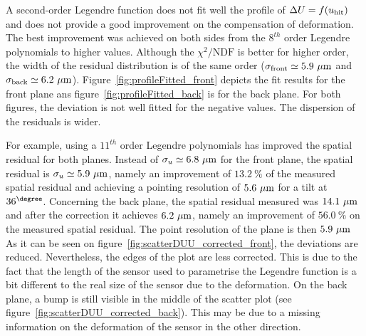       A second-order Legendre function does not fit well the profile of $\Delta U=f(u_{\rm{hit}})$ and does not provide a good improvement on the compensation of deformation.
      The best improvement was achieved on both sides from the $8^{th}$ order Legendre polynomials to higher values.
      Although the $\chi^2 \text{/NDF}$ is better for higher order, the width of the residual distribution is of the same order ($\sigma_{\rm{front}}\simeq 5.9~\rm{\mu m}$ and $\sigma_{\rm{back}} \simeq 6.2~\rm{\mu m}$).
      Figure~\ref{fig:profileFitted_front} depicts the fit results for the front plane ans figure~\ref{fig:profileFitted_back} is for the back plane.
      For both figures, the deviation is not well fitted for the negative values.
      The dispersion of the residuals is wider. 

      For example, using a $11^{th}$ order Legendre polynomials has improved the spatial residual for both planes. 
      Instead of $\sigma_{u} \simeq 6.8~\rm{\mu m}$ for the front plane, the spatial residual is $\sigma_{u} \simeq 5.9~\rm{\mu m}$, namely an improvement of $13.2~\%$ of the measured spatial residual and achieving a pointing resolution of $5.6~\rm{\mu m}$ for a tilt at $36^{\degree}$.
      Concerning the back plane, the spatial residual measured was $14.1~\rm{\mu m}$ and after the correction it achieves $6.2~\rm{\mu m}$, namely an improvement of $56.0~\%$ on the measured spatial residual.
      The point resolution of the plane is then $5.9~\rm{\mu m}$
      As it can be seen on figure~\ref{fig:scatterDUU_corrected_front}, the deviations are reduced. 
      Nevertheless, the edges of the plot are less corrected.
      This is due to the fact that the length of the sensor used to parametrise the Legendre function is a bit different to the real size of the sensor due to the deformation.
      On the back plane, a bump is still visible in the middle of the scatter plot (see figure~\ref{fig:scatterDUU_corrected_back}).
      This may be due to a missing information on the deformation of the sensor in the other direction.

